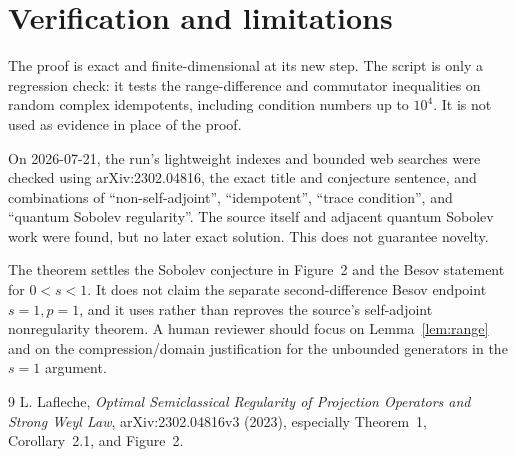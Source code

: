 \documentclass[11pt]{article}
\begin{document}
\section*{Verification and limitations}

The proof is exact and finite-dimensional at its new step.  The script
 is only a regression check: it
tests the range-difference and commutator inequalities on random complex
idempotents, including condition numbers up to $10^4$.  It is not used as
evidence in place of the proof.

On 2026-07-21, the run's lightweight indexes and bounded web searches were
checked using arXiv:2302.04816, the exact title and conjecture sentence, and
combinations of ``non-self-adjoint'', ``idempotent'', ``trace condition'', and
``quantum Sobolev regularity''.  The source itself and adjacent quantum
Sobolev work were found, but no later exact solution.  This does not guarantee
novelty.

The theorem settles the Sobolev conjecture in Figure~2 and the Besov statement
for $0<s<1$.  It does not claim the separate second-difference Besov endpoint
$s=1,p=1$, and it uses rather than reproves the source's self-adjoint
nonregularity theorem.  A human reviewer should focus on
Lemma~\ref{lem:range} and on the compression/domain justification for the
unbounded generators in the $s=1$ argument.

\begin{thebibliography}{9}
L. Lafleche,
\emph{Optimal Semiclassical Regularity of Projection Operators and Strong Weyl Law},
arXiv:2302.04816v3 (2023), especially Theorem~1, Corollary~2.1, and Figure~2.
\end{thebibliography}
\end{document}
